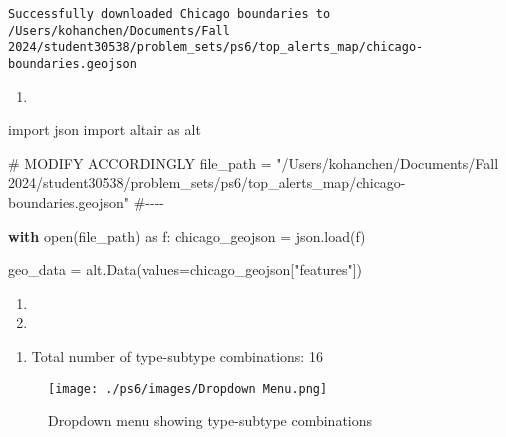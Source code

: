 \documentclass[
  letterpaper,
  DIV=11,
  numbers=noendperiod]{scrartcl}
\newenvironment{Shaded}{\begin{snugshade}}{\end{snugshade}}
\newcommand{\BuiltInTok}[1]{\textcolor[rgb]{0.00,0.23,0.31}{#1}}
\newcommand{\CommentTok}[1]{\textcolor[rgb]{0.37,0.37,0.37}{#1}}
\newcommand{\ControlFlowTok}[1]{\textcolor[rgb]{0.00,0.23,0.31}{\textbf{#1}}}
\newcommand{\ImportTok}[1]{\textcolor[rgb]{0.00,0.46,0.62}{#1}}
\newcommand{\NormalTok}[1]{\textcolor[rgb]{0.00,0.23,0.31}{#1}}
\newcommand{\OperatorTok}[1]{\textcolor[rgb]{0.37,0.37,0.37}{#1}}
\newcommand{\StringTok}[1]{\textcolor[rgb]{0.13,0.47,0.30}{#1}}
\providecommand{\tightlist}{%
  \setlength{\itemsep}{0pt}\setlength{\parskip}{0pt}}\usepackage{longtable,booktabs,array}
\begin{document}
\begin{verbatim}
Successfully downloaded Chicago boundaries to /Users/kohanchen/Documents/Fall 2024/student30538/problem_sets/ps6/top_alerts_map/chicago-boundaries.geojson
\end{verbatim}

\begin{enumerate}
\def\labelenumi{\alph{enumi}.}
\setcounter{enumi}{1}
\tightlist
\item
\end{enumerate}

\begin{Shaded}
\begin{Highlighting}[]
\ImportTok{import}\NormalTok{ json}
\ImportTok{import}\NormalTok{ altair }\ImportTok{as}\NormalTok{ alt}

\CommentTok{\# MODIFY ACCORDINGLY}
\NormalTok{file\_path }\OperatorTok{=} \StringTok{"/Users/kohanchen/Documents/Fall 2024/student30538/problem\_sets/ps6/top\_alerts\_map/chicago{-}boundaries.geojson"}
\CommentTok{\#{-}{-}{-}{-}}

\ControlFlowTok{with} \BuiltInTok{open}\NormalTok{(file\_path) }\ImportTok{as}\NormalTok{ f:}
\NormalTok{    chicago\_geojson }\OperatorTok{=}\NormalTok{ json.load(f)}

\NormalTok{geo\_data }\OperatorTok{=}\NormalTok{ alt.Data(values}\OperatorTok{=}\NormalTok{chicago\_geojson[}\StringTok{"features"}\NormalTok{])}
\end{Highlighting}
\end{Shaded}

\begin{enumerate}
\def\labelenumi{\arabic{enumi}.}
\setcounter{enumi}{3}
\tightlist
\item
\item
\end{enumerate}

\begin{enumerate}
\def\labelenumi{\alph{enumi}.}
\tightlist
\item
  Total number of type-subtype combinations: 16
\end{enumerate}

\begin{figure}[H]

{\centering \texttt{[image: ./ps6/images/Dropdown Menu.png]}

}

\caption{Dropdown menu showing type-subtype combinations}

\end{figure}%
\end{document}
